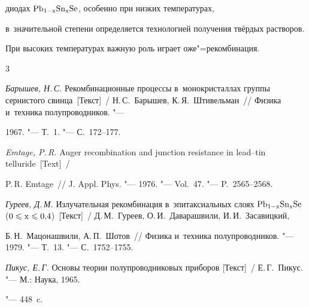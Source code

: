 диодах \linebreak $\rm Pb_{1 - x}Sn_{x}Se$, особенно при низких температурах, 

в~значительной степени определяется технологией получения твёрдых растворов. 

При высоких температурах важную роль играет оже"=рекомбинация.











\begin{thebibliography}{3}

\item \textit{Барышев, Н.\,С.} Рекомбинационные процессы в~монокристаллах группы сернистого свинца~[Текст]~/ Н.\,С.~Барышев, К.\,Я.~Штивельман~/\!/ Физика и~техника полупроводников. "--- 

1967. "--- Т.~1. "--- С.~172--177.



\item \textit{Emtage, P.\,R.} Auger recombination and junction resistance in lead--tin telluride~[Text]~/ 

P.\,R. Emtage~/\!/ J. Appl. Phys. "--- 1976. "--- Vol.~47. "--- P.~2565--2568.



\item \textit{Гуреев, Д.\,М.} Излучательная рекомбинация в~эпитаксиальных слоях $\rm Pb_{1 - x}Sn_{x}Se$ ($\rm 0 

\leqslant x\leqslant  0{,}4$)~[Текст]~/ Д.\,М.~Гуреев, О.\,И.~Даварашвили, И.\,И.~Засавицкий, 

Б.\,Н.~Мацонашвили, А.\,П.~Шотов~/\!/ Физика и~техника полупроводников. "--- 1979. "--- Т.~13. "--- С.~1752--1755.



\item \textit{Пикус, Е.\,Г.} Основы теории полупроводниковых приборов [Текст]~/ Е.\,Г.~Пикус. "--- М.: Наука, 1965. 

"--- 448~c.



\end{thebibliography}



\vspace{10mm}

\lfoot[]{}

  \rfoot[]{}



\makeengtitle







%

